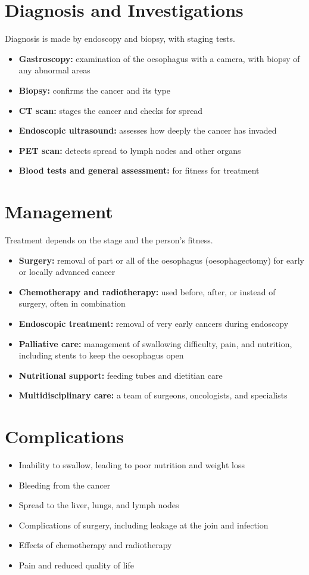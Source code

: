 \section*{Diagnosis and Investigations}
Diagnosis is made by endoscopy and biopsy, with staging tests.
\begin{itemize}
    \item \textbf{Gastroscopy:} examination of the oesophagus with a camera, with biopsy of any abnormal areas
    \item \textbf{Biopsy:} confirms the cancer and its type
    \item \textbf{CT scan:} stages the cancer and checks for spread
    \item \textbf{Endoscopic ultrasound:} assesses how deeply the cancer has invaded
    \item \textbf{PET scan:} detects spread to lymph nodes and other organs
    \item \textbf{Blood tests and general assessment:} for fitness for treatment
\end{itemize}

\section*{Management}
Treatment depends on the stage and the person's fitness.
\begin{itemize}
    \item \textbf{Surgery:} removal of part or all of the oesophagus (oesophagectomy) for early or locally advanced cancer
    \item \textbf{Chemotherapy and radiotherapy:} used before, after, or instead of surgery, often in combination
    \item \textbf{Endoscopic treatment:} removal of very early cancers during endoscopy
    \item \textbf{Palliative care:} management of swallowing difficulty, pain, and nutrition, including stents to keep the oesophagus open
    \item \textbf{Nutritional support:} feeding tubes and dietitian care
    \item \textbf{Multidisciplinary care:} a team of surgeons, oncologists, and specialists
\end{itemize}

\section*{Complications}
\begin{itemize}
    \item Inability to swallow, leading to poor nutrition and weight loss
    \item Bleeding from the cancer
    \item Spread to the liver, lungs, and lymph nodes
    \item Complications of surgery, including leakage at the join and infection
    \item Effects of chemotherapy and radiotherapy
    \item Pain and reduced quality of life
\end{itemize}

